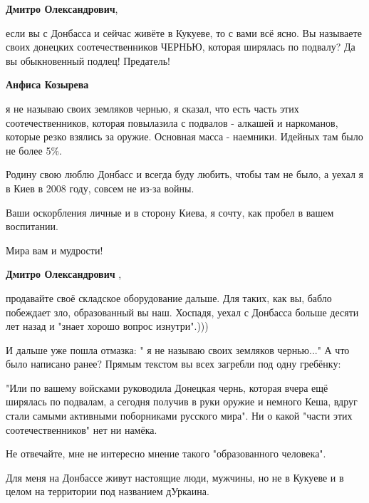 \begin{itemize}
\begin{itemize}
\textbf{Дмитро Олександрович}, 

если вы с Донбасса и сейчас живёте в Кукуеве, то с вами всё ясно. Вы называете
своих донецких соотечественников ЧЕРНЬЮ, которая ширялась по подвалу? Да вы
обыкновенный подлец! Предатель!

 
\textbf{Анфиса Козырева} 

я не называю своих земляков чернью, я сказал, что есть часть этих
соотечественников, которая повылазила с подвалов - алкашей и наркоманов,
которые резко взялись за оружие. Основная масса - наемники. Идейных там было не
более 5\%.

Родину свою люблю Донбасс и всегда буду любить, чтобы там не было, а уехал я в
Киев в 2008 году, совсем не из-за войны.

Ваши оскорбления личные и в сторону Киева, я сочту, как пробел в вашем
воспитании.

Мира вам и мудрости!

 
\textbf{Дмитро Олександрович} , 

продавайте своё складское оборудование дальше. Для таких, как вы, бабло
побеждает зло, образованный вы наш. Хоспадя, уехал с Донбасса больше десяти лет
назад и "знает хорошо вопрос изнутри".)))

И дальше уже пошла отмазка: " я не называю своих земляков чернью..." А что было
написано ранее? Прямым текстом вы всех загребли под одну гребёнку:

"Или по вашему войсками руководила Донецкая чернь, которая вчера ещё ширялась
по подвалам, а сегодня получив в руки оружие и немного Кеша, вдруг стали самыми
активными поборниками русского мира". Ни о какой "части этих соотечественников"
нет ни намёка.

Не отвечайте, мне не интересно мнение такого "образованного человека".

Для меня на Донбассе живут настоящие люди, мужчины, но не в Кукуеве и в целом
на территории под названием дУркаина.



\end{itemize}
\end{itemize}
